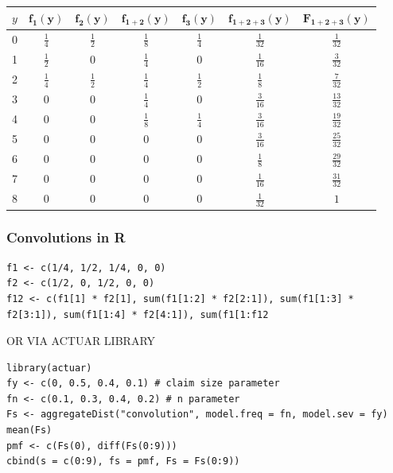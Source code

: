 \documentclass{article}
\begin{document}
\begin{table}[h!]
\centering
\begin{tabular}{c c c c c c c}
\toprule
\textbf{\(y\)} & \(\mathbf{f_1(y)}\) & \(\mathbf{f_2(y)}\) & \(\mathbf{f_{1+2}(y)}\) & \(\mathbf{f_3(y)}\) & \(\mathbf{f_{1+2+3}(y)}\) & \(\mathbf{F_{1+2+3}(y)}\)\\
\midrule
0 & \(\tfrac{1}{4}\) & \(\tfrac{1}{2}\) & \(\tfrac{1}{8}\) & \(\tfrac{1}{4}\) & \(\tfrac{1}{32}\) & \(\tfrac{1}{32}\) \\
\midrule
1 & \(\tfrac{1}{2}\) & \(0\)           & \(\tfrac{1}{4}\) & \(0\)           & \(\tfrac{1}{16}\) & \(\tfrac{3}{32}\) \\
\midrule
2 & \(\tfrac{1}{4}\) & \(\tfrac{1}{2}\) & \(\tfrac{1}{4}\) & \(\tfrac{1}{2}\) & \(\tfrac{1}{8}\)  & \(\tfrac{7}{32}\) \\
\midrule
3 & \(0\)            & \(0\)           & \(\tfrac{1}{4}\) & \(0\)           & \(\tfrac{3}{16}\) & \(\tfrac{13}{32}\) \\
\midrule
4 & \(0\)            & \(0\)           & \(\tfrac{1}{8}\) & \(\tfrac{1}{4}\) & \(\tfrac{3}{16}\) & \(\tfrac{19}{32}\) \\
\midrule
5 & \(0\)            & \(0\)           & \(0\)            & \(0\)           & \(\tfrac{3}{16}\) & \(\tfrac{25}{32}\) \\
\midrule
6 & \(0\)            & \(0\)           & \(0\)            & \(0\)           & \(\tfrac{1}{8}\)  & \(\tfrac{29}{32}\) \\
\midrule
7 & \(0\)            & \(0\)           & \(0\)            & \(0\)           & \(\tfrac{1}{16}\) & \(\tfrac{31}{32}\) \\
\midrule
8 & \(0\)            & \(0\)           & \(0\)            & \(0\)           & \(\tfrac{1}{32}\) & \(1\)              \\
\bottomrule
\end{tabular}
\label{tab:mytable}
\end{table}


\subsubsection{Convolutions in R}
\begin{lstlisting}
f1 <- c(1/4, 1/2, 1/4, 0, 0)
f2 <- c(1/2, 0, 1/2, 0, 0)
f12 <- c(f1[1] * f2[1], sum(f1[1:2] * f2[2:1]), sum(f1[1:3] * f2[3:1]), sum(f1[1:4] * f2[4:1]), sum(f1[1:f12
\end{lstlisting}

OR VIA ACTUAR LIBRARY
\begin{lstlisting}
library(actuar)
fy <- c(0, 0.5, 0.4, 0.1) # claim size parameter
fn <- c(0.1, 0.3, 0.4, 0.2) # n parameter
Fs <- aggregateDist("convolution", model.freq = fn, model.sev = fy)
mean(Fs)
pmf <- c(Fs(0), diff(Fs(0:9)))
cbind(s = c(0:9), fs = pmf, Fs = Fs(0:9))
\end{lstlisting}
\end{document}

